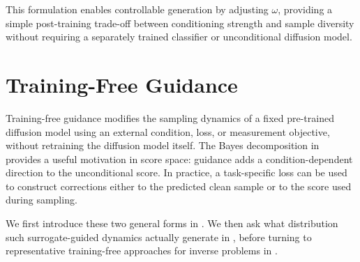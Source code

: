 This formulation enables controllable generation by adjusting $\omega$,
providing a simple post-training trade-off between conditioning strength and
sample diversity without requiring a separately trained classifier or
unconditional diffusion model.




\clearpage
\newpage



\section{Training-Free Guidance}
Training-free guidance modifies the sampling dynamics of a fixed pre-trained
diffusion model using an external condition, loss, or measurement objective,
without retraining the diffusion model itself. The Bayes decomposition in
 provides a useful motivation in score space: guidance
adds a condition-dependent direction to the unconditional score. In practice,
a task-specific loss can be used to construct corrections either to the
predicted clean sample or to the score used during sampling.

We first introduce these two general forms in . We then ask
what distribution such surrogate-guided dynamics actually generate in
, before turning to representative
training-free approaches for inverse problems in
.


